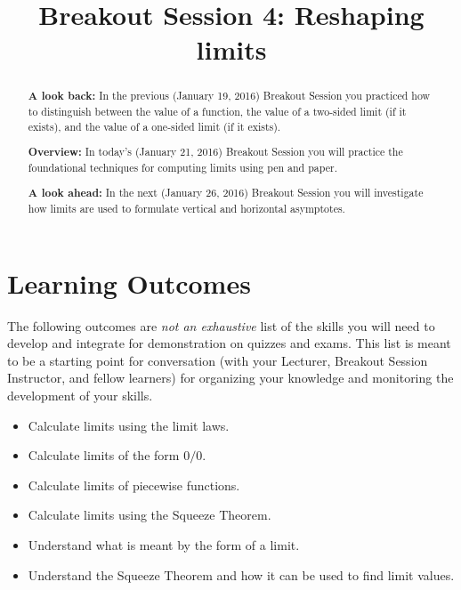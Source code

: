 \documentclass[handout,nooutcomes]{ximera}
\title{Breakout Session 4: Reshaping limits}
\begin{document}
\begin{abstract}
 \textbf{A look back:} In the previous (January 19, 2016) Breakout Session you practiced how to distinguish between the value of a function, the value of a two-sided limit (if it exists), and the value of a one-sided limit (if it exists).

 \textbf{Overview:} In today's (January 21, 2016) Breakout Session you will practice the foundational techniques for computing limits using pen and paper.

  \textbf{A look ahead:} In the next (January 26, 2016) Breakout Session you will investigate how limits are used to formulate vertical and horizontal asymptotes.
\end{abstract}
\maketitle

\section{Learning Outcomes}
\label{section:learning-outcomes}
The following outcomes are \emph{not an exhaustive} list of the skills you will need to develop and integrate for demonstration on quizzes and exams.
This list is meant to be a starting point for conversation (with your Lecturer, Breakout Session Instructor, and fellow learners) for organizing your knowledge and monitoring the development of your skills.
\begin{itemize}
  \item 
    Calculate limits using the limit laws.
  \item 
    Calculate limits of the form $0/0$.
  \item
    Calculate limits of piecewise functions.
  \item 
    Calculate limits using the Squeeze Theorem.
  \item
    Understand what is meant by the form of a limit.
  \item
    Understand the Squeeze Theorem and how it can be used to find limit values.

\end{itemize}
\newpage
\end{document}
